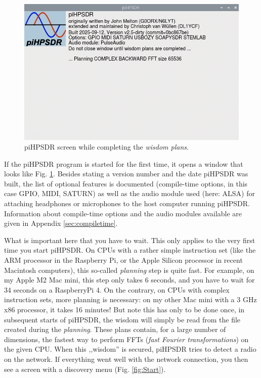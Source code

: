 \documentclass[12pt]{book}
\def\pH{pi\-HPSDR\xspace}
\begin{document}
\begin{figure}
\center
\includegraphics[scale=0.45]{Planning.png}
\caption{\pH screen while completing the \textit{wisdom plans}.}
\label{fig:Planning}
\end{figure}

If the \pH program is started for the first time, it opens a window that looks like Fig. \ref{fig:Planning}.
Besides stating a version number and the date \pH was built, the list of optional features is
documented (compile-time options,
in this case  GPIO, MIDI, SATURN) as well as the audio module used (here: ALSA) for attaching headphones
or microphones to the host computer running \pH. Information about compile-time options and the
audio modules available are given in Appendix \ref{sec:compiletime}.

What is important here that you have to wait. This only applies to the very first time you start \pH.
On CPUs with a rather simple instruction set (like the ARM processor in the Raspberry Pi, or the Apple
Silicon processor in recent Macintosh computers), this so-called  \textit{planning} step is quite fast. For
example, on my
Apple M2 Mac mini, this step only takes 6 seconds, and you have to wait for 34 seconds on a RaspberryPi 4.
On the contrary, on CPUs with
complex instruction sets, more planning is necessary: on my other Mac mini with a 3 GHz x86 processor, it
takes 16 minutes! But note
this has only to be done once, in subsequent starts of \pH, the wisdom will simply be read from
the file created during the \textit{planning}. These plans contain, for a large number of dimensions,
the fastest way to perform FFTs (\textit{fast Fourier transformations}) on the given CPU.
When this ,,wisdom'' is secured, \pH tries to detect a radio on the network. If everything went well with
the network connection, you then see a screen with a discovery menu (Fig. \ref{fig:Start}).
\end{document}
